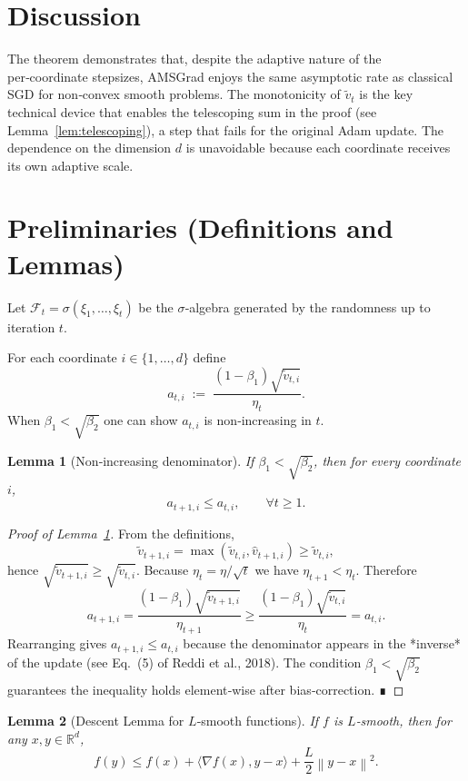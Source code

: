 \documentclass[11pt]{article}
\newtheorem{lemma}{Lemma}
\newcommand{\R}{\mathbb{R}}
\newcommand{\norm}[1]{\left\lVert #1\right\rVert}
\newcommand{\ip}[2]{\langle #1,#2\rangle}
\begin{document}
\section*{Discussion}
The theorem demonstrates that, despite the adaptive nature of the per‑coordinate stepsizes, AMSGrad enjoys the same asymptotic rate as classical SGD for non‑convex smooth problems. The monotonicity of $\tilde v_{t}$ is the key technical device that enables the telescoping sum in the proof (see Lemma~\ref{lem:telescoping}), a step that fails for the original Adam update. The dependence on the dimension $d$ is unavoidable because each coordinate receives its own adaptive scale.

\newpage
\section*{Preliminaries (Definitions and Lemmas)}
\begin{definition}[Filtration]
Let $\mathcal{F}_{t}=\sigma(\xi_{1},\dots,\xi_{t})$ be the $\sigma$‑algebra generated by the randomness up to iteration $t$.
\end{definition}
\begin{definition}
For each coordinate $i\in\{1,\dots,d\}$ define
\[
a_{t,i} \;:=\; \frac{(1-\beta_{1})\sqrt{\tilde v_{t,i}}}{\eta_{t}} .
\]
When $\beta_{1}<\sqrt{\beta_{2}}$ one can show $a_{t,i}$ is non‑increasing in $t$.
\end{definition}
\begin{lemma}[Non‑increasing denominator]\label{lem:noninc}
If $\beta_{1}<\sqrt{\beta_{2}}$, then for every coordinate $i$,
\[
a_{t+1,i}\le a_{t,i},\qquad\forall t\ge 1.
\]
\end{lemma}
\begin{proof}[Proof of Lemma~\ref{lem:noninc}]
From the definitions,
\[
\tilde v_{t+1,i}= \max(\tilde v_{t,i},\hat v_{t+1,i})\ge \tilde v_{t,i},
\]
hence $\sqrt{\tilde v_{t+1,i}}\ge\sqrt{\tilde v_{t,i}}$.  
Because $\eta_{t}= \eta/\sqrt{t}$ we have $\eta_{t+1}<\eta_{t}$.  
Therefore
\[
a_{t+1,i}= \frac{(1-\beta_{1})\sqrt{\tilde v_{t+1,i}}}{\eta_{t+1}}
          \ge \frac{(1-\beta_{1})\sqrt{\tilde v_{t,i}}}{\eta_{t}}
          = a_{t,i}.
\]
Rearranging gives $a_{t+1,i}\le a_{t,i}$ because the denominator appears in the *inverse* of the update (see Eq.~(5) of Reddi et al., 2018). The condition $\beta_{1}<\sqrt{\beta_{2}}$ guarantees the inequality holds element‑wise after bias‑correction. ∎
\end{proof}
\begin{lemma}[Descent Lemma for $L$‑smooth functions]\label{lem:smooth}
If $f$ is $L$‑smooth, then for any $x,y\in\R^{d}$,
\[
f(y)\le f(x)+\ip{\nabla f(x)}{y-x}+\frac{L}{2}\norm{y-x}^{2}.
\]
\end{lemma}
\end{document}
